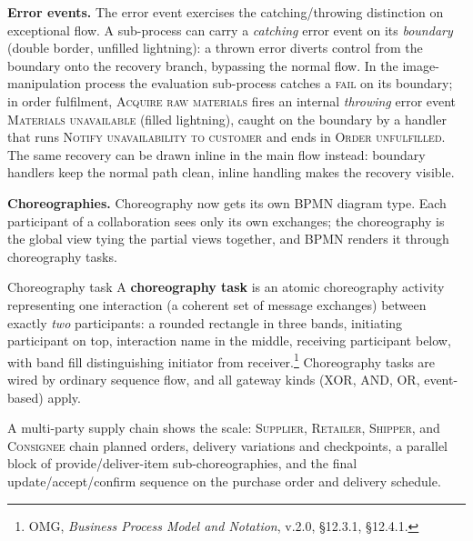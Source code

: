 \textbf{Error events.} The error event exercises the catching/throwing distinction on exceptional flow. A sub-process can carry a \emph{catching} error event on its \emph{boundary} (double border, unfilled lightning): a thrown error diverts control from the boundary onto the recovery branch, bypassing the normal flow. In the image-manipulation process the evaluation sub-process catches a \textsc{fail} on its boundary; in order fulfilment, \textsc{Acquire raw materials} fires an internal \emph{throwing} error event \textsc{Materials unavailable} (filled lightning), caught on the boundary by a handler that runs \textsc{Notify unavailability to customer} and ends in \textsc{Order unfulfilled}. The same recovery can be drawn inline in the main flow instead: boundary handlers keep the normal path clean, inline handling makes the recovery visible.

\textbf{Choreographies.} Choreography now gets its own BPMN diagram type. Each participant of a collaboration sees only its own exchanges; the choreography is the global view tying the partial views together, and BPMN renders it through choreography tasks.

\begin{definitionbox}{Choreography task}
A \textbf{choreography task} is an atomic choreography activity representing one interaction (a coherent set of message exchanges) between exactly \emph{two} participants: a rounded rectangle in three bands, initiating participant on top, interaction name in the middle, receiving participant below, with band fill distinguishing initiator from receiver.\footnote{OMG, \emph{Business Process Model and Notation}, v.2.0, \S12.3.1, \S12.4.1.} Choreography tasks are wired by ordinary sequence flow, and all gateway kinds (XOR, AND, OR, event-based) apply.
\end{definitionbox}

A multi-party supply chain shows the scale: \textsc{Supplier}, \textsc{Retailer}, \textsc{Shipper}, and \textsc{Consignee} chain planned orders, delivery variations and checkpoints, a parallel block of provide/deliver-item sub-choreographies, and the final update/accept/confirm sequence on the purchase order and delivery schedule.

